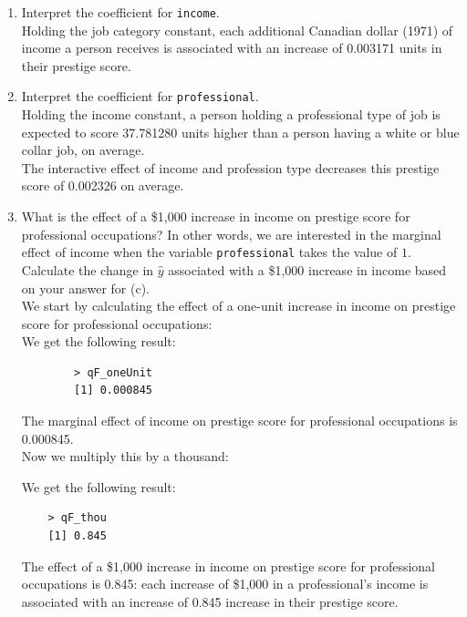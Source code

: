 \documentclass[12pt,letterpaper]{article}
\begin{document}
\begin{enumerate}
	
	
\newpage
	\item [(d)]
	Interpret the coefficient for \texttt{income}. \\
	Holding the job category constant, each additional Canadian dollar (1971) of income a person receives is associated with an increase of 0.003171 units in their prestige score.
	
	\vspace{1cm}	
	\item [(e)]
	Interpret the coefficient for \texttt{professional}. \\
	Holding the income constant, a person holding a professional type of job is expected to score 37.781280 units higher than a person having a white or blue collar job, on average.\\
	The interactive effect of income and profession type decreases this prestige score of 0.002326 on average.
	
	\vspace{1cm}
	\item [(f)]
	What is the effect of a \$1,000 increase in income on prestige score for professional occupations? In other words, we are interested in the marginal effect of income when the variable \texttt{professional} takes the value of $1$. Calculate the change in $\hat{y}$ associated with a \$1,000 increase in income based on your answer for (c). \\
	
	We start by calculating the effect of a one-unit increase in income on prestige score for professional occupations:\\
	
	 
	\newpage
	We get the following result:
	
		\begin{verbatim}
		> qF_oneUnit
		[1] 0.000845
	\end{verbatim}
	
	The marginal effect of income on prestige score for professional occupations is 0.000845. \\
	Now we multiply this by a thousand:
	
	
	We get the following result:
	
	\begin{verbatim}
	> qF_thou
	[1] 0.845
	\end{verbatim}
	
	The effect of a \$1,000 increase in income on prestige score for professional occupations is 0.845: each increase of \$1,000 in a professional's income is associated with an increase of 0.845 increase in their prestige score.
	

\end{enumerate}
\end{document}

